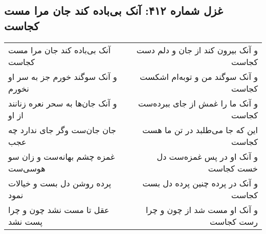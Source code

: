 \begin{center}
\section*{غزل شماره ۴۱۲: آنک بی‌باده کند جان مرا مست کجاست}
\label{sec:0412}
\begin{longtable}{l p{0.5cm} r}
آنک بی‌باده کند جان مرا مست کجاست
&&
و آنک بیرون کند از جان و دلم دست کجاست
\\
و آنک سوگند خورم جز به سر او نخورم
&&
و آنک سوگند من و توبه‌ام اشکست کجاست
\\
و آنک جان‌ها به سحر نعره زنانند از او
&&
و آنک ما را غمش از جای ببرده‌ست کجاست
\\
جان جان‌ست وگر جای ندارد چه عجب
&&
این که جا می‌طلبد در تن ما هست کجاست
\\
غمزه چشم بهانه‌ست و زان سو هوسی‌ست
&&
و آنک او در پس غمزه‌ست دل خست کجاست
\\
پرده روشن دل بست و خیالات نمود
&&
و آنک در پرده چنین پرده دل بست کجاست
\\
عقل تا مست نشد چون و چرا پست نشد
&&
و آنک او مست شد از چون و چرا رست کجاست
\\
\end{longtable}
\end{center}
